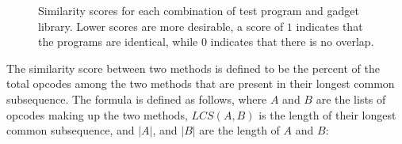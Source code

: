     \begin{figure}[t]
        \vspace{-50pt}
        \caption[Graph of variation between generated programs]
        {Similarity scores for each combination of test program and gadget
        library. Lower scores are more desirable, a score of $1$ indicates that
        the programs are identical, while $0$ indicates that there is no
        overlap.}
        \label{tab:results-different}
    \end{figure}
    The similarity score between two methods is defined to be the percent of
    the total opcodes among the two methods that are present in their longest
    common subsequence. The formula is defined as follows, where
    $A$ and $B$ are the lists of opcodes making up the two methods,
    $LCS(A,B)$ is the length of their longest common subsequence, and $|A|$,
    and $|B|$ are the length of $A$ and $B$:

